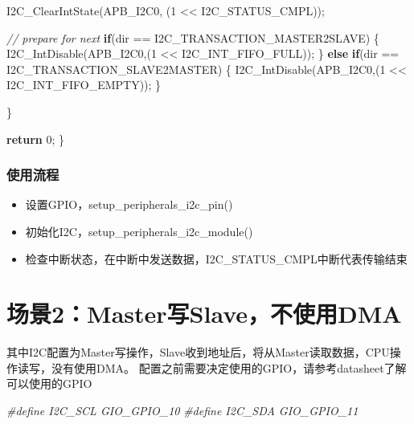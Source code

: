 \documentclass[
  12pt,
]{book}
\newenvironment{Shaded}{\begin{snugshade}}{\end{snugshade}}
\newcommand{\CommentTok}[1]{\textcolor[rgb]{0.56,0.35,0.01}{\textit{#1}}}
\newcommand{\ControlFlowTok}[1]{\textcolor[rgb]{0.13,0.29,0.53}{\textbf{#1}}}
\newcommand{\DecValTok}[1]{\textcolor[rgb]{0.00,0.00,0.81}{#1}}
\newcommand{\NormalTok}[1]{#1}
\newcommand{\PreprocessorTok}[1]{\textcolor[rgb]{0.56,0.35,0.01}{\textit{#1}}}
\providecommand{\tightlist}{%
  \setlength{\itemsep}{0pt}\setlength{\parskip}{0pt}}
\begin{document}
\begin{Shaded}
\begin{Highlighting}[]
\NormalTok{    I2C_ClearIntState(APB_I2C0, (}\DecValTok{1}\NormalTok{ << I2C_STATUS_CMPL));}
    
    \CommentTok{// prepare for next}
    \ControlFlowTok{if}\NormalTok{(dir == I2C_TRANSACTION_MASTER2SLAVE)}
\NormalTok{    \{}
\NormalTok{        I2C_IntDisable(APB_I2C0,(}\DecValTok{1}\NormalTok{ << I2C_INT_FIFO_FULL));}
\NormalTok{    \}}
    \ControlFlowTok{else} \ControlFlowTok{if}\NormalTok{(dir == I2C_TRANSACTION_SLAVE2MASTER)}
\NormalTok{    \{}
\NormalTok{        I2C_IntDisable(APB_I2C0,(}\DecValTok{1}\NormalTok{ << I2C_INT_FIFO_EMPTY));}
\NormalTok{    \}}

\NormalTok{  \}}

  \ControlFlowTok{return} \DecValTok{0}\NormalTok{;}
\NormalTok{\}}
\end{Highlighting}
\end{Shaded}

\hypertarget{ux4f7fux7528ux6d41ux7a0b-1}{%
\subsubsection{使用流程}\label{ux4f7fux7528ux6d41ux7a0b-1}}

\begin{itemize}
\tightlist
\item
  设置GPIO，setup\_peripherals\_i2c\_pin()
\item
  初始化I2C，setup\_peripherals\_i2c\_module()
\item
  检查中断状态，在中断中发送数据，I2C\_STATUS\_CMPL中断代表传输结束
\end{itemize}

\hypertarget{ux573aux666f2masterux5199slaveux4e0dux4f7fux7528dma}{%
\section{场景2：Master写Slave，不使用DMA}\label{ux573aux666f2masterux5199slaveux4e0dux4f7fux7528dma}}

其中I2C配置为Master写操作，Slave收到地址后，将从Master读取数据，CPU操作读写，没有使用DMA。 配置之前需要决定使用的GPIO，请参考datasheet了解可以使用的GPIO

\begin{Shaded}
\begin{Highlighting}[]
\PreprocessorTok{#define I2C_SCL         GIO_GPIO_10}
\PreprocessorTok{#define I2C_SDA         GIO_GPIO_11}
\end{Highlighting}
\end{Shaded}
\end{document}
